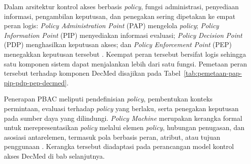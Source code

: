Dalam arsitektur kontrol akses berbasis \textit{policy}, fungsi administrasi, penyediaan informasi, pengambilan keputusan, dan penegakan sering dipetakan ke empat peran logis: \textit{Policy Administration Point} (PAP) mengelola \textit{policy}; \textit{Policy Information Point} (PIP) menyediakan informasi evaluasi; \textit{Policy Decision Point} (PDP) menghasilkan keputusan akses; dan \textit{Policy Enforcement Point} (PEP) menegakkan keputusan tersebut \autocite{hu2014abac}. Keempat peran tersebut bersifat logis sehingga satu komponen sistem dapat menjalankan lebih dari satu fungsi. Pemetaan peran tersebut terhadap komponen DecMed disajikan pada Tabel~\ref{tab:pemetaan-pap-pip-pdp-pep-decmed}.

Penerapan PBAC meliputi pendefinisian \textit{policy}, pembentukan konteks permintaan, evaluasi terhadap \textit{policy} yang berlaku, serta penegakan keputusan pada sumber daya yang dilindungi. \textit{Policy Machine} merupakan kerangka formal untuk merepresentasikan \textit{policy} melalui elemen \textit{policy}, hubungan penugasan, dan asosiasi antarelemen, termasuk pola berbasis peran, atribut, atau tujuan penggunaan \autocite{ferraiolo2015policy}. Kerangka tersebut diadaptasi pada perancangan model kontrol akses DecMed di bab selanjutnya.
